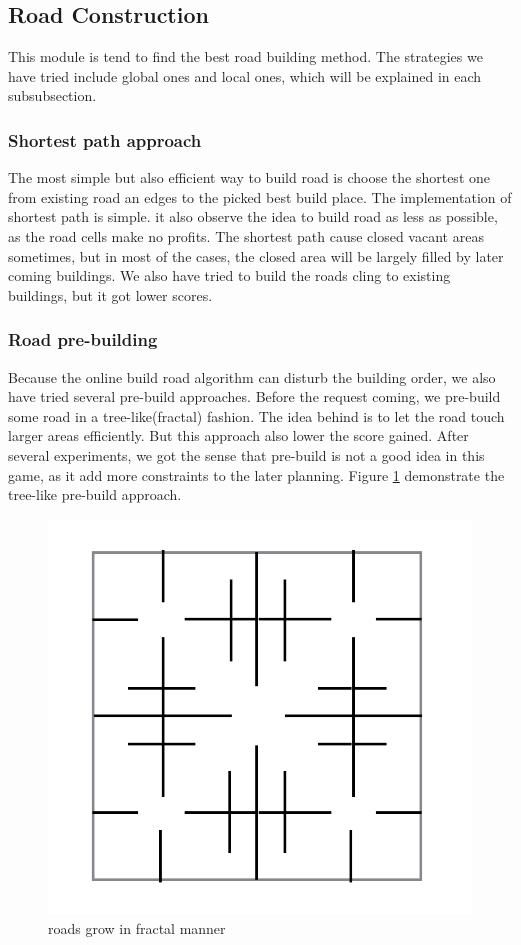 \subsection{Road Construction}
This module is tend to find the best road building method. The strategies we have tried include global ones and local ones, which will be explained in each subsubsection.
\subsubsection{Shortest path approach}
The most simple but also efficient way to build road is choose the shortest one from existing road an edges to the picked best build place. The implementation of shortest path is simple. it also observe the idea to build road as less as possible, as the road cells make no profits. The shortest path cause closed vacant areas sometimes, but in most of the cases, the closed area will be largely filled by later coming buildings. We also have tried to build the roads cling to existing buildings, but it got lower scores.
\subsubsection{Road pre-building}
Because the online build road algorithm can disturb the building order, we also have tried several pre-build approaches. Before the request coming, we pre-build some road in a tree-like(fractal) fashion. The idea behind is to let the road touch larger areas efficiently. But this approach also lower the score gained. After several experiments, we got the sense that pre-build is not a good idea in this game, as it add more constraints to the later planning.
Figure \ref{fig: prebuildRoad} demonstrate the tree-like pre-build approach.

\begin{figure}
\center
\includegraphics[scale=0.5]{prebuildRoad.png}
\caption{roads grow in fractal manner}
\label{fig: prebuildRoad}
\end{figure}

